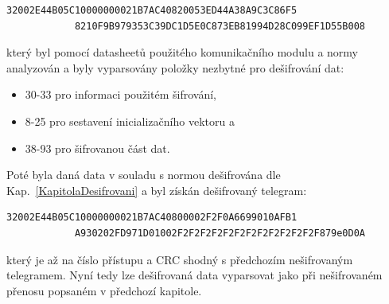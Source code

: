 \begin{lstlisting}[style=MyCodePHP]
			32002E44B05C10000000021B7AC40820053ED44A38A9C3C86F5
			8210F9B979353C39DC1D5E0C873EB81994D28C099EF1D55B008
\end{lstlisting}

který byl pomocí datasheetů použitého komunikačního modulu \cite{ModulIQRF} a normy~\cite{Norma1,NormaFIPS} analyzován a byly vyparsovány položky nezbytné pro dešifrování dat:
\begin{itemize}
	\item 30-33 pro informaci použitém šifrování,
	\item 8-25 pro sestavení inicializačního vektoru a
	\item 38-93 pro šifrovanou část dat.
\end{itemize}


Poté byla daná data v souladu s normou \cite{NormaFIPS} dešifrována dle Kap.~\ref{KapitolaDesifrovani} a byl získán dešifrovaný telegram:

\newpage

\begin{lstlisting}[style=MyCodePHP]
			32002E44B05C10000000021B7AC40800002F2F0A6699010AFB1
			A930202FD971D01002F2F2F2F2F2F2F2F2F2F2F2F2F879e0D0A
\end{lstlisting}

který je až na číslo přístupu a CRC shodný s předchozím nešifrovaným telegramem. Nyní tedy lze dešifrovaná data vyparsovat jako při nešifrovaném přenosu popsaném v předchozí kapitole.

